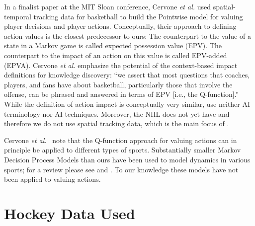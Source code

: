 \documentclass[runningheads,a4paper]{llncs}
\begin{document}
In a finalist paper at the MIT Sloan conference, \cite{Cervone2014a} Cervone {\em et al.} used spatial-temporal tracking data for basketball to build the {\sc Pointwise} model for valuing player decisions and player actions. Conceptually, their approach to defining action values is the closest predecessor to ours: The counterpart to the value of a state in a Markov game is called expected possession value (EPV). The counterpart to the impact of an action on this value is called EPV-added (EPVA). Cervone {\em et al.} emphasize the potential of the context-based impact definitions for knowledge discovery: ``we assert that most questions that coaches, players, and fans have about basketball, particularly those that involve the offense, can be phrased and answered in terms of EPV [i.e., the Q-function].'' While the definition of action impact is conceptually very similar, \cite{Cervone2014a} use neither AI terminology nor AI techniques. Moreover, the NHL does not yet have and therefore we do not use spatial tracking data, which is the main focus of \cite{Cervone2014a}. 

Cervone {\em et al.}~\cite{Cervone2014} note that the Q-function approach for valuing actions can in principle be applied to different types of sports. 
Substantially smaller Markov Decision Process Models than ours have been used to model dynamics in various sports; for a review please see \cite{Cervone2014a} and \cite{Routley2015a}. To our knowledge these models have not been applied to valuing actions. 




\section{Hockey Data Used}
\label{sec:background-notation}
\end{document}
